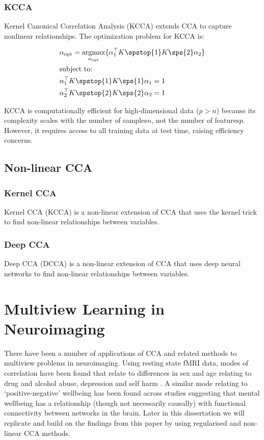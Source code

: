 \subsubsection{KCCA}

Kernel Canonical Correlation Analysis (KCCA) extends CCA to capture nonlinear relationships. The optimization problem for KCCA is:

\begin{align}
    & \alpha_{\text{opt}}=\underset{\alpha_{\text{opt}}}{\mathrm{argmax}}\{ \alpha_1^{\top}K\spstop{1}K\sps{2}\alpha_2  \}\\
    & \text{subject to:} \notag\\
    & \alpha_1^{\top}K\spstop{1}K\sps{1}\alpha_1=1 \notag\\
    & \alpha_2^{\top}K\spstop{2}K\sps{2}\alpha_2=1 \notag
\end{align}


KCCA is computationally efficient for high-dimensional data (\(p>n\)) because its complexity scales with the number of samples\(n\), not the number of features\(p\).
However, it requires access to all training data at test time, raising efficiency concerns.

\subsection{Non-linear CCA}

\subsubsection{Kernel CCA}

Kernel CCA (KCCA) is a non-linear extension of CCA that uses the kernel trick to find non-linear relationships between variables.

\subsubsection{Deep CCA}

Deep CCA (DCCA) is a non-linear extension of CCA that uses deep neural networks to find non-linear relationships between variables.

\section{Multiview Learning in Neuroimaging}

There have been a number of applications of CCA and related methods to multiview problems in neuroimaging.
Using resting state fMRI data, modes of correlation have been found that relate to differences in sex and age relating to drug and alcohol abuse, depression and self harm \citep{mihalik2019brain}.
A similar mode relating to `positive-negative' wellbeing has been found across studies \citep{smith2015positive}suggesting that mental wellbeing has a relationship (though not necessarily causally) with functional connectivity between networks in the brain.
Later in this dissertation we will replicate and build on the findings from this paper by using regularised and non-linear CCA methods.

